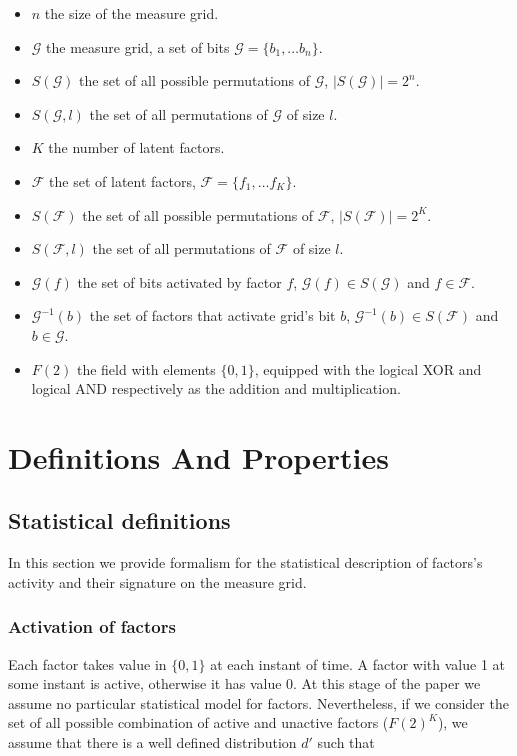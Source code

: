 \documentclass[a4paper, 11pt]{article}
\begin{document}
\begin{itemize}
\item $n$ the size of the measure grid. 
\item $\mathcal{G}$ the measure grid, a set of bits $\mathcal{G} = \lbrace b_1, \ldots b_n \rbrace$.
\item $S(\mathcal{G})$  the set of all possible permutations of $\mathcal{G}$, $\vert S(\mathcal{G})\vert = 2^{n}$.
\item $S(\mathcal{G}, l)$  the set of all permutations of $\mathcal{G}$ of size $l$.
\item $K$ the number of latent factors.
\item $\mathcal{F}$ the set of latent factors, $\mathcal{F} = \lbrace f_1, \ldots f_K \rbrace$.
\item $S(\mathcal{F})$  the set of all possible permutations of $\mathcal{F}$, $\vert S(\mathcal{F})\vert = 2^{K}$.
\item $S(\mathcal{F}, l)$  the set of all permutations of $\mathcal{F}$ of size $l$.
\item $\mathcal{G}(f)$  the set of bits activated by factor $f$, $\mathcal{G}(f) \in S(\mathcal{G})$ and $f \in \mathcal{F}$.  
\item $\mathcal{G}^{-1}(b)$  the set of factors that activate grid's bit $b$, $\mathcal{G}^{-1}(b) \in S(\mathcal{F})$ and $b \in \mathcal{G}$.
\item $F(2)$ the field with elements $\{0, 1\}$, equipped with the logical XOR and logical AND respectively as the addition and multiplication.
\end{itemize}

  
\section{Definitions And Properties}

\subsection{Statistical definitions}

In this section we provide formalism for the statistical description of factors's activity and their signature on the measure grid.

\subsubsection*{Activation of factors}

Each factor takes value in $\{ 0, 1\}$ at each instant of time. A factor with value 1 at some instant is active, otherwise it has value 0. At this stage of the paper we assume no particular statistical model for factors. Nevertheless, if we consider the set of all possible combination of active and unactive factors ($F(2)^{K}$), we assume that there is a well defined distribution $d'$ such that 
\end{document}
